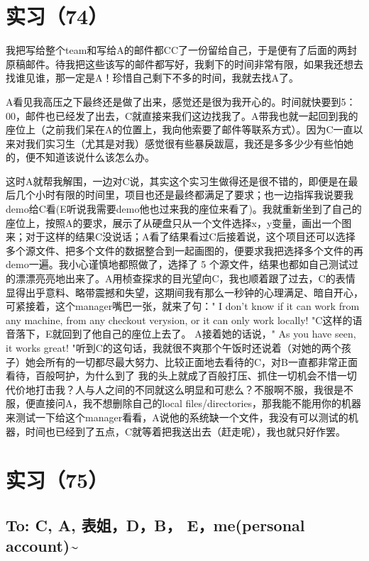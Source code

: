 \documentclass[12pt]{book}
\begin{document}
\section{实习（74）　}
\label{sec-5-77}

我把写给整个team和写给A的邮件都CC了一份留给自己，于是便有了后面的两封原稿邮件。待我把这些该写的邮件都写好，我剩下的时间非常有限，如果我还想去找谁见谁，那一定是A！珍惜自己剩下不多的时间，我就去找A了。

A看见我高压之下最终还是做了出来，感觉还是很为我开心的。时间就快要到5：00，邮件也已经发了出去，C就直接来我们这边找我了。A带我也就一起回到我的座位上（之前我们呆在A的位置上，我向他索要了邮件等联系方式）。因为C一直以来对我们实习生（尤其是对我）感觉很有些暴戾跋扈，我还是多多少少有些怕她的，便不知道该说什么该怎么办。

这时A就帮我解围，一边对C说，其实这个实习生做得还是很不错的，即便是在最后几个小时有限的时间里，项目也还是最终都满足了要求；也一边指挥我说要我demo给C看(E听说我需要demo他也过来我的座位来看了)。我就重新坐到了自己的座位上，按照A的要求，展示了从硬盘只从一个文件选择x，y变量，画出一个图来；对于这样的结果C没说话；A看了结果看过C后接着说，这个项目还可以选择多个源文件、把多个文件的数据整合到一起画图的，便要求我把选择多个文件的再demo一遍。我小心谨慎地都照做了，选择了 5 个源文件，结果也都如自己测试过的漂漂亮亮地出来了。A用桢查探求的目光望向C，我也顺着跟了过去，C的表情显得出乎意料、略带震撼和失望，这期间我有那么一秒钟的心理满足、暗自开心，可紧接着，这个manager嘴巴一张，就来了句：" I don't know if it can work from any machine, from any checkout verysion, or it can only work locally! "C这样的语音落下，E就回到了他自己的座位上去了。 A接着她的话说，" As you have seen, it works great! "听到C的这句话，我就很不爽那个午饭时还说着（对她的两个孩子）她会所有的一切都尽最大努力、比较正面地去看待的C，对B一直都非常正面看待，百般呵护，为什么到了 我的头上就成了百般打压、抓住一切机会不惜一切代价地打击我？人与人之间的不同就这么明显和可悲么？不服啊不服，我很是不服，便直接问A，我不想删除自己的local files/directories，那我能不能用你的机器来测试一下给这个manager看看，A说他的系统缺一个文件，我没有可以测试的机器，时间也已经到了五点，C就等着把我送出去（赶走呢），我也就只好作罢。 


\section{实习（75）　}
\label{sec-5-78}

\subsection{To: C, A, 表姐，D，B， E，me(personal account)\textasciitilde{}~}
\label{sec-5-78-1}
\end{document}
